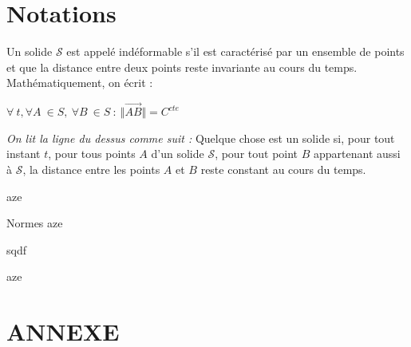 \documentclass[
	11pt, %
	fleqn, %
	a4paper, %
]{LegrandOrangeBook}
\begin{document}
\section{Notations}

\begin{definition}
Un solide $\mathcal{S}$ est appelé indéformable s'il est caractérisé par un ensemble de points et que la distance entre deux points reste invariante au cours du temps. Mathématiquement, on écrit :


    $ \forall \ t,\forall A\ \in S,\ \forall B\ \in S\ :\ \Vert \overrightarrow{AB}\Vert =C^{cte} \ $ 


\textit{On lit la ligne du dessus comme suit :} Quelque chose est un solide si, pour tout instant $t$, pour tous points $A$ d'un solide $\mathcal{S}$, pour tout point $B$ appartenant aussi à $\mathcal{S}$, la distance entre les points $A$ et $B$ reste constant au cours du temps.
\end{definition}



\begin{corollary}[S2.4] 
aze
\end{corollary}

\begin{definition}{Normes}
aze
\end{definition}

\begin{theorem}
    sqdf
\end{theorem}

\begin{remark}
    aze
\end{remark}







\chapterspaceabove{6.25cm} %
\chapterspacebelow{7.5cm} %



	




\newpage
\section{ANNEXE}


{} %
\printindex %
\end{document}
